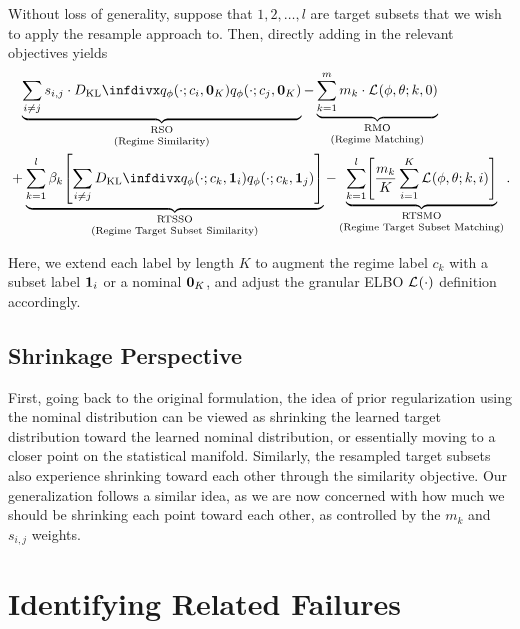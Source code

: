 \begin{example}
    Without loss of generality, suppose that $1,2,\ldots, l$ are target subsets that we wish to apply the resample approach to. Then, directly adding in the relevant objectives yields
    \begin{align}
        \label{eq:gen-calnf-loss-one-target}
        &\phantom{+}
        \underbrace{\sum_{i\ne j} s_{i,j}\cdot \DKL{\qvd{\cdot;c_i,\vzero_K}}{\qvd{\cdot;c_j,\vzero_K}}}_{\substack{\mathstrut\text{RSO}\mathstrut\\\text{(Regime Similarity)}}}
        -\underbrace{\sum_{k=1}^m m_k\cdot \elbo{}{\phi,\theta;k,0}}_{\substack{\mathstrut\text{RMO}\mathstrut\\\text{(Regime Matching)}}} \\
        &+ \underbrace{\sum_{k=1}^l\beta_k \spars*{
        \sum_{i\ne j} \DKL{\qvd{\cdot;c_k,\vone_i}}{\qvd{\cdot;c_k,\vone_j}}}}_{\substack{\mathstrut\text{RTSSO}\mathstrut\\\text{(Regime Target Subset Similarity)}}}
        -\underbrace{\sum_{k=1}^l \spars*{\frac{m_k}K \sum_{i=1}^K \elbo{}{\phi,\theta;k,i}} }_{\substack{\mathstrut\text{RTSMO}\mathstrut\\\text{(Regime Target Subset Matching)}}}.
    \end{align}
\end{example}

Here, we extend each label by length $K$ to augment the regime label $c_k$ with a subset label $\mathbf{1}_i$ or a nominal $\mathbf{0}_K$, and adjust the granular ELBO $\elbo{}{\cdot}$ definition accordingly.

\subsection{Shrinkage Perspective}

First, going back to the original \CALNF{} formulation, the idea of prior regularization using the nominal distribution can be viewed as shrinking the learned target distribution toward the learned nominal distribution, or essentially moving to a closer point on the statistical manifold. Similarly, the resampled target subsets also experience shrinking toward each other through the similarity objective. Our generalization follows a similar idea, as we are now concerned with how much we should be shrinking each point toward each other, as controlled by the $m_k$ and $s_{i,j}$ weights.

\section{Identifying Related Failures}

